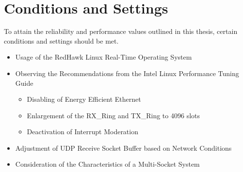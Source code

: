 \section{Conditions and Settings}
To attain the reliability and performance values outlined in this thesis, certain conditions and settings should be met.

\begin{itemize}
	\item Usage of the RedHawk Linux Real-Time Operating System
	\item Observing the Recommendations from the Intel Linux Performance Tuning Guide \cite{intermod03}
		\begin{itemize}
  			\item Disabling of Energy Efficient Ethernet
  			\item Enlargement of the RX\_Ring and TX\_Ring to 4096 slots
  			\item Deactivation of Interrupt Moderation
		\end{itemize}
	\item Adjustment of UDP Receive Socket Buffer based on Network Conditions
	\item Consideration of the Characteristics of a Multi-Socket System
\end{itemize}
